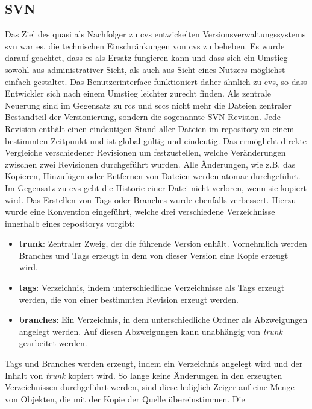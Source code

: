 \subsection{SVN}\label{sec:svn}
Das Ziel des quasi als Nachfolger zu \acrshort{cvs} entwickelten
Versionsverwaltungssystems \acrfull{svn} war es, die technischen
Einschränkungen von \acrshort{cvs} zu beheben. Es wurde darauf geachtet, dass
es als Ersatz fungieren kann und dass sich ein Umstieg sowohl aus
administrativer Sicht, als auch aus Sicht eines Nutzers möglichst einfach gestaltet.
Das Benutzerinterface funktioniert daher ähnlich zu \acrshort{cvs}, so dass
Entwickler sich nach einem Umstieg leichter zurecht finden. Als zentrale
Neuerung sind im Gegensatz zu \acrshort{rcs} und \acrshort{sccs} nicht mehr
die Dateien zentraler Bestandteil der Versionierung, sondern die sogenannte SVN
Revision. Jede Revision enthält einen eindeutigen Stand aller Dateien im
\gls{repository} zu einem bestimmten Zeitpunkt und ist global gültig und
eindeutig. Das ermöglicht direkte Vergleiche verschiedener Revisionen um
festzustellen, welche Veränderungen zwischen zwei Revisionen durchgeführt
wurden. Alle Änderungen, wie z.B. das Kopieren, Hinzufügen oder Entfernen von
Dateien werden atomar durchgeführt. Im Gegensatz zu \acrshort{cvs} geht die
Historie einer Datei nicht verloren, wenn sie kopiert wird. Das Erstellen von
Tags oder Branches wurde ebenfalls verbessert. Hierzu wurde eine Konvention
eingeführt, welche drei verschiedene Verzeichnisse innerhalb eines
\glspl{repository} vorgibt:
\begin{itemize}
\item \textbf{trunk}: Zentraler Zweig, der die führende Version enhält.
      Vornehmlich werden Branches und Tags erzeugt in dem von dieser Version
      eine Kopie erzeugt wird.
\item \textbf{tags}: Verzeichnis, indem unterschiedliche Verzeichnisse als
       Tags erzeugt werden, die von einer bestimmten Revision erzeugt werden.
\item \textbf{branches}: Ein Verzeichnis, in dem unterschiedliche Ordner als
      Abzweigungen angelegt werden. Auf diesen Abzweigungen kann unabhängig von
      \textit{trunk} gearbeitet werden.
\end{itemize}
Tags und Branches werden erzeugt, indem ein Verzeichnis angelegt wird und der
Inhalt von \textit{trunk} kopiert wird. So lange keine Änderungen in den
erzeugten Verzeichnissen durchgeführt werden, sind diese lediglich Zeiger auf
eine Menge von Objekten, die mit der Kopie der Quelle übereinstimmen. Die
